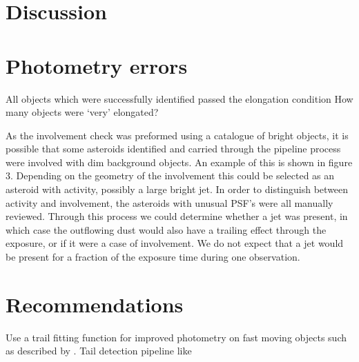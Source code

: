 \documentclass[iop,apj]{emulateapj}
\begin{document}
\section{Discussion}

\section{Photometry errors}



All objects which were successfully identified passed the elongation condition
How many objects were `very' elongated?


As the involvement check was preformed using a catalogue of bright objects, it is possible that some asteroids identified and carried through the pipeline process were involved with dim background objects. An example of this is shown in figure 3. Depending on the geometry of the involvement this could be selected as an asteroid with activity, possibly a large bright jet. In order to distinguish between activity and involvement, the asteroids with unusual PSF's were all manually reviewed. Through this process we could determine whether a jet was present, in which case the outflowing dust would also have a trailing effect through the exposure, or if it were a case of involvement. We do not expect that a jet would be present for a fraction of the exposure time during one observation. 

\section{Recommendations }

Use a trail fitting function for improved photometry on fast moving objects such as described by \cite{veres12}.
Tail detection pipeline like \cite{sonnett11}




\end{document}
